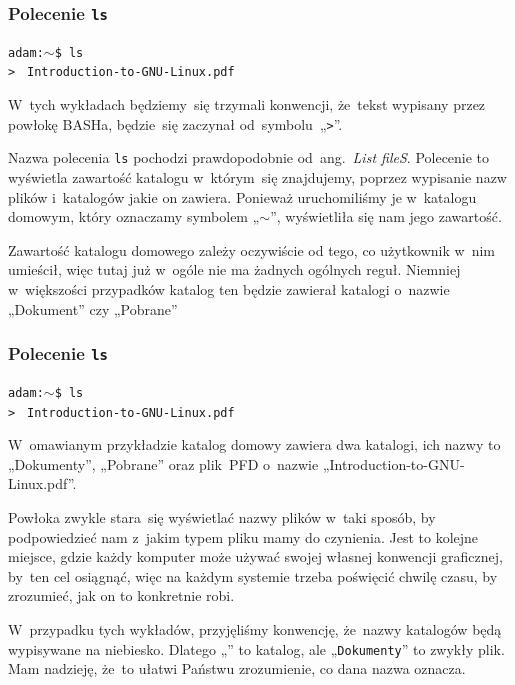 \documentclass[10pt,t]{beamer}
\begin{document}
\begin{frame}
  \frametitle{Polecenie \texttt{ls}}


  \texttt{adam:$\sim$\$ ls} \\
  \texttt{> } \quad
  \texttt{Introduction-to-GNU-Linux.pdf} \quad
  \texttt{}

  W~tych wykładach będziemy~się trzymali konwencji, że~tekst wypisany
  przez powłokę BASHa, będzie~się zaczynał od~symbolu~„\texttt{>}”.

  Nazwa polecenia \texttt{ls} pochodzi prawdopodobnie od~ang.~\textit{List
    fileS}. Polecenie to wyświetla zawartość katalogu w~którym~się
  znajdujemy, poprzez wypisanie nazw plików i~katalogów jakie on zawiera.
  Ponieważ uruchomiliśmy je w~katalogu domowym, który oznaczamy
  symbolem „\texttt{$\sim$}”, wyświetliła się nam jego zawartość.

  Zawartość katalogu domowego zależy oczywiście od tego, co użytkownik
  w~nim umieścił, więc tutaj już w~ogóle nie ma żadnych ogólnych reguł.
  Niemniej w~większości przypadków katalog ten będzie zawierał katalogi
  o~nazwie „Dokument” czy „Pobrane”

\end{frame}





\begin{frame}
  \frametitle{Polecenie \texttt{ls}}


  \texttt{adam:$\sim$\$ ls} \\
  \texttt{> } \quad
  \texttt{Introduction-to-GNU-Linux.pdf} \quad
  \texttt{}

  W~omawianym przykładzie katalog domowy zawiera dwa katalogi, ich nazwy
  to „Dokumenty”, „Pobrane” oraz plik~PFD o~nazwie
  „Introduction-to-GNU-Linux.pdf”.

  Powłoka zwykle stara~się wyświetlać nazwy plików w~taki sposób, by
  podpowiedzieć nam z~jakim typem pliku mamy do czynienia. Jest to kolejne
  miejsce, gdzie każdy komputer może używać swojej własnej konwencji
  graficznej, by~ten cel osiągnąć, więc na każdym systemie trzeba poświęcić
  chwilę czasu, by zrozumieć, jak on to konkretnie robi.

  W~przypadku tych wykładów, przyjęliśmy konwencję, że~nazwy katalogów
  będą wypisywane na niebiesko. Dlatego „\texttt{}”
  to katalog, ale „\texttt{Dokumenty}” to zwykły plik. Mam nadzieję, że~to
  ułatwi Państwu zrozumienie, co dana nazwa oznacza.

\end{frame}
\end{document}
